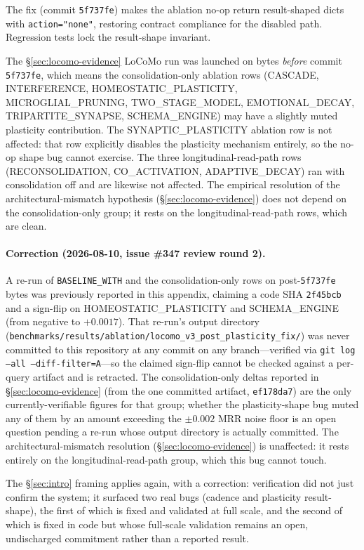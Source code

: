 \documentclass[11pt]{article}
\begin{document}
The fix (commit \texttt{5f737fe}) makes the ablation no-op return
result-shaped dicts with \texttt{action="none"}, restoring contract
compliance for the disabled path.  Regression tests lock the
result-shape invariant.

The \S\ref{sec:locomo-evidence} LoCoMo run was launched on bytes
\emph{before} commit \texttt{5f737fe}, which means the
consolidation-only ablation rows (CASCADE, INTERFERENCE,
HOMEOSTATIC\_PLASTICITY, MICROGLIAL\_PRUNING, TWO\_STAGE\_MODEL,
EMOTIONAL\_DECAY, TRIPARTITE\_SYNAPSE, SCHEMA\_ENGINE) may have a
slightly muted plasticity contribution.  The SYNAPTIC\_PLASTICITY
ablation row is not affected: that row explicitly disables the
plasticity mechanism entirely, so the no-op shape bug cannot
exercise.  The three longitudinal-read-path rows (RECONSOLIDATION,
CO\_ACTIVATION, ADAPTIVE\_DECAY) ran with consolidation off and are
likewise not affected.  The empirical resolution of the
architectural-mismatch hypothesis (\S\ref{sec:locomo-evidence}) does
not depend on the consolidation-only group; it rests on the
longitudinal-read-path rows, which are clean.

\paragraph{Correction (2026-08-10, issue \#347 review round 2).}
\label{sec:locomo-postfix}
A re-run of \texttt{BASELINE\_WITH} and the consolidation-only rows
on post-\texttt{5f737fe} bytes was previously reported in this
appendix, claiming a code SHA \texttt{2f45bcb} and a sign-flip on
HOMEOSTATIC\_PLASTICITY and SCHEMA\_ENGINE (from negative to
$+0.0017$).  That re-run's output directory
(\texttt{benchmarks/results/ablation/locomo\_v3\_post\_plasticity\_fix/})
was never committed to this repository at any commit on any
branch---verified via \texttt{git log --all --diff-filter=A}---so the
claimed sign-flip cannot be checked against a per-query artifact and
is retracted.  The consolidation-only deltas reported in
\S\ref{sec:locomo-evidence} (from the one committed artifact,
\texttt{ef178da7}) are the only currently-verifiable figures for that
group; whether the plasticity-shape bug muted any of them by an
amount exceeding the $\pm 0.002$ MRR noise floor is an open question
pending a re-run whose output directory is actually committed.  The
architectural-mismatch resolution (\S\ref{sec:locomo-evidence}) is
unaffected: it rests entirely on the longitudinal-read-path group,
which this bug cannot touch.

The \S\ref{sec:intro} framing applies again, with a correction: verification did not
just confirm the system; it surfaced two real bugs (cadence and
plasticity result-shape), the first of which is fixed and validated
at full scale, and the second of which is fixed in code but whose
full-scale validation remains an open, undischarged commitment rather
than a reported result.



\end{document}
